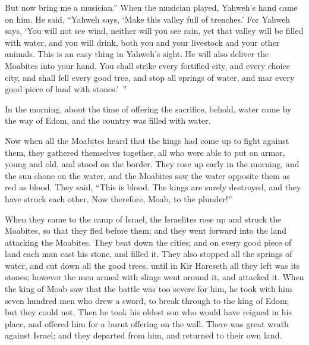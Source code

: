 {But now bring me a musician.” When the musician played, Yahweh’s hand came on him.
He said, “Yahweh says, ‘Make this valley full of trenches.’
For Yahweh says, ‘You will not see wind, neither will you see rain, yet that valley will be filled with water, and you will drink, both you and your livestock and your other animals.
This is an easy thing in Yahweh’s sight. He will also deliver the Moabites into your hand.
You shall strike every fortified city, and every choice city, and shall fell every good tree, and stop all springs of water, and mar every good piece of land with stones.’ ”
\par }{\PP {}In the morning, about the time of offering the sacrifice, behold, water came by the way of Edom, and the country was filled with water.
\par }{\PP {}Now when all the Moabites heard that the kings had come up to fight against them, they gathered themselves together, all who were able to put on armor, young and old, and stood on the border.
They rose up early in the morning, and the sun shone on the water, and the Moabites saw the water opposite them as red as blood.
They said, “This is blood. The kings are surely destroyed, and they have struck each other. Now therefore, Moab, to the plunder!”
\par }{\PP {}When they came to the camp of Israel, the Israelites rose up and struck the Moabites, so that they fled before them; and they went forward into the land attacking the Moabites.
They beat down the cities; and on every good piece of land each man cast his stone, and filled it. They also stopped all the springs of water, and cut down all the good trees, until in Kir Hareseth all they left was its stones; however the men armed with slings went around it, and attacked it.
When the king of Moab saw that the battle was too severe for him, he took with him seven hundred men who drew a sword, to break through to the king of Edom; but they could not.
Then he took his oldest son who would have reigned in his place, and offered him for a burnt offering on the wall. There was great wrath against Israel; and they departed from him, and returned to their own land.

}

